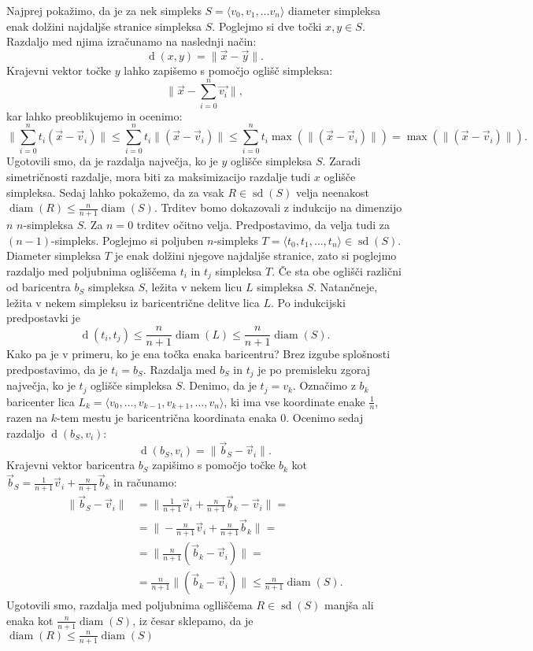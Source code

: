 \documentclass[mat1]{fmfdelo}
\DeclareMathOperator{\diam}{diam}
\DeclareMathOperator{\sd}{sd}
\DeclareMathOperator{\dist}{d}
\newcommand{\0}{\underline{0}}
\begin{document}
\begin{dokaz}
Najprej pokažimo, da je za nek simpleks $S = \langle v_0, v_1, \dots v_n \rangle$ diameter simpleksa enak dolžini najdaljše stranice simpleksa $S$. Poglejmo si dve točki $x, y \in S$. Razdaljo med njima izračunamo na naslednji način:
$$\dist(x, y) = \| \vec{x} - \vec{y} \|.$$
Krajevni vektor točke $y$ lahko zapišemo s pomočjo oglišč simpleksa:
$$\| \vec{x} - \sum_{i=0}^n \vec{v_i} \|,$$
kar lahko preoblikujemo in ocenimo:
$$\| \sum_{i=0}^n t_i (\vec{x} - \vec{v}_i)\| \leq \sum_{i=0}^n t_i \| (\vec{x} - \vec{v}_i) \| \leq \sum_{i=0}^n t_i \max(\| (\vec{x} - \vec{v}_i) \|) = \max(\| (\vec{x} - \vec{v}_i) \|).$$
Ugotovili smo, da je razdalja največja, ko je $y$ oglišče simpleksa $S$. Zaradi simetričnosti razdalje, mora biti za maksimizacijo razdalje tudi $x$ oglišče simpleksa.
Sedaj lahko pokažemo, da za vsak $R \in \sd(S)$ velja neenakost $\diam(R) \leq \frac{n}{n + 1} \diam(S)$.
Trditev bomo dokazovali z indukcijo na dimenzijo $n$ $n$-simpleksa $S$. Za $n = 0$ trditev očitno velja. Predpostavimo, da velja tudi za $(n-1)$-simpleks. Poglejmo si poljuben $n$-simpleks $T = \langle t_0, t_1, \dots, t_n \rangle \in \sd(S)$. Diameter simpleksa $T$ je enak dolžini njegove najdaljše stranice, zato si poglejmo razdaljo med poljubnima ogliščema $t_i$ in $t_j$ simpleksa $T$. Če sta obe oglišči različni od baricentra $b_S$ simpleksa $S$, ležita v nekem licu $L$ simpleksa $S$. Natančneje, ležita v nekem simpleksu iz baricentrične delitve lica $L$. Po indukcijski predpostavki je
$$\dist(t_i, t_j) \leq \frac{n}{n + 1} \diam(L) \leq \frac{n}{n + 1} \diam(S).$$
Kako pa je v primeru, ko je ena točka enaka baricentru? Brez izgube splošnosti predpostavimo, da je $t_i = b_S$. Razdalja med $b_S$ in $t_j$ je po premisleku zgoraj največja, ko je $t_j$ oglišče simpleksa $S$. Denimo, da je $t_j = v_k$. Označimo z $b_k$ baricenter lica $L_k = \langle v_0, \dots, v_{k-1}, v_{k+1}, \dots, v_n \rangle$, ki ima vse koordinate enake $\frac{1}{n}$, razen na $k$-tem mestu je baricentrična koordinata enaka $0$. Ocenimo sedaj razdaljo $\dist(b_S, v_i)$:
$$\dist(b_S, v_i) = \|\vec{b}_S - \vec{v}_i \|.$$
Krajevni vektor baricentra $b_S$ zapišimo s pomočjo točke $b_k$ kot $\vec{b}_S = \frac{1}{n+1} \vec{v}_i + \frac{n}{n+1} \vec{b}_k$ in računamo:
\begin{align*}
\|\vec{b}_S - \vec{v}_i \| &= \| \frac{1}{n+1} \vec{v}_i + \frac{n}{n+1} \vec{b}_k - \vec{v}_i \| =\\
&= \| -\frac{n}{n+1} \vec{v}_i + \frac{n}{n+1} \vec{b}_k\| =\\
&= \| \frac{n}{n+1} (\vec{b}_k - \vec{v}_i)\| =\\
&= \frac{n}{n+1} \|(\vec{b}_k - \vec{v}_i)\| \leq \frac{n}{n+1} \diam(S).
\end{align*}
Ugotovili smo, razdalja med poljubnima oglliščema $R \in \sd(S)$ manjša ali enaka kot $\frac{n}{n+1} \diam(S)$, iz česar sklepamo, da je $\diam(R) \leq \frac{n}{n+1} \diam(S)$ 
\end{dokaz}
\end{document}
